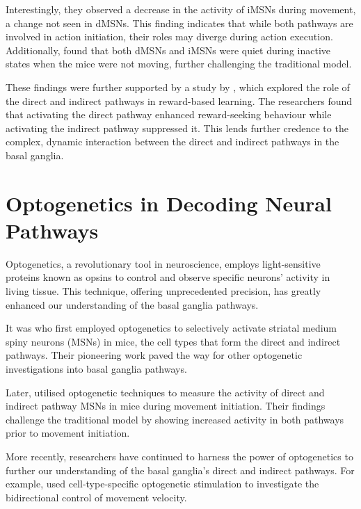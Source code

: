 \documentclass[10pt]{article}
\begin{document}
\begin{sloppypar}
  Interestingly, they observed a decrease in the activity of iMSNs during movement, a change not seen in dMSNs. This finding indicates that while both pathways are involved in action initiation, their roles may diverge during action execution. Additionally, \cite{cui_concurrent_2013} found that both dMSNs and iMSNs were quiet during inactive states when the mice were not moving, further challenging the traditional model.

  These findings were further supported by a study by \cite{guillaumin_optogenetic_2020}, which explored the role of the direct and indirect pathways in reward-based learning. The researchers found that activating the direct pathway enhanced reward-seeking behaviour while activating the indirect pathway suppressed it. This lends further credence to the complex, dynamic interaction between the direct and indirect pathways in the basal ganglia.

  \section{Optogenetics in Decoding Neural Pathways}
  \label{sec:the-role-of-optogenetics-in-neural-pathways}

  Optogenetics, a revolutionary tool in neuroscience, employs light-sensitive proteins known as opsins to control and observe specific neurons’ activity in living tissue. This technique, offering unprecedented precision, has greatly enhanced our understanding of the basal ganglia pathways.

  It was \cite{kravitz_regulation_2010} who first employed optogenetics to selectively activate striatal medium spiny neurons (MSNs) in mice, the cell types that form the direct and indirect pathways. Their pioneering work paved the way for other optogenetic investigations into basal ganglia pathways.

  Later, \cite{cui_concurrent_2013} utilised optogenetic techniques to measure the activity of direct and indirect pathway MSNs in mice during movement initiation. Their findings challenge the traditional model by showing increased activity in both pathways prior to movement initiation.

  More recently, researchers have continued to harness the power of optogenetics to further our understanding of the basal ganglia’s direct and indirect pathways. For example, \cite{yttri_opponent_2016} used cell-type-specific optogenetic stimulation to investigate the bidirectional control of movement velocity.


\end{sloppypar}
\end{document}
